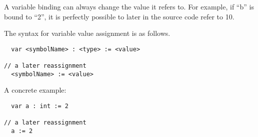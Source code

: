 A variable binding can always change the value it refers to. For example, if \enquote{b} is bound to \enquote{2}, it is perfectly possible to later in the source code refer to {10}.

The syntax for variable value assignment is as follows.

\begin{verbatim}
  var <symbolName> : <type> := <value>

// a later reassignment
  <symbolName> := <value>
\end{verbatim}
A concrete example:

\begin{verbatim}
  var a : int := 2
  
// a later reassignment
  a := 2
\end{verbatim}

